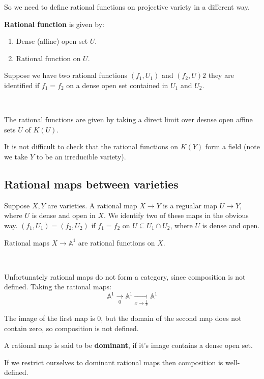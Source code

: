 So we need to define rational functions on projective variety in a different way.

\begin{definition}
    \textbf{Rational function} is given by:\begin{enumerate}[label = (\alph*)]
        \item Dense (affine) open set $U$.
        \item Rational function on $U$.
    \end{enumerate}

Suppose we have two rational functions $(f_1,U_1)$ and $(f_2,U)2$ they are identified if $f_1 = f_2$ on a dense open set contained in $U_1$ and $U_2$.

\

The rational functions are given by taking a direct limit over desnse open affine sets $U$ of $K(U)$.
\end{definition}

It is not difficult to check that the rational functions on $K(Y)$ form a field (note we take $Y$ to be an irreducible variety).

\subsection{Rational maps between varieties}

Suppose $X,Y$ are varieties. A rational map $X\rightarrow Y$ is a regualar map $U\rightarrow Y$, where $U$ is dense and open in $X$. We identify two of these maps in the obvious way. $(f_1,U_1) = (f_2,U_2)$ if $f_1=f_2$ on $U\subseteq U_1\cap U_2$, where $U$ is dense and open.

Rational maps $X\rightarrow \mathbb{A}^1$ are rational functions on $X$.

\

Unfortunately rational maps do not form a category, since composition is not defined. Taking the rational maps:\[\mathbb{A}^1\underset{0}{\longrightarrow}\mathbb{A}^1\underset{x\rightarrow \frac{1}{x}}{\longrightarrow}\mathbb{A}^1\]

The image of the first map is $0$, but the domain of the second map does not contain zero, so composition is not defined.

\begin{definition}
    A rational map is said to be \textbf{dominant}, if it's image contains a dense open set.
\end{definition}
If we restrict ourselves to dominant rational maps then composition is well-defined.


